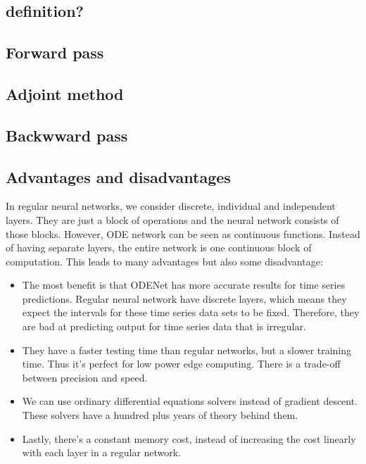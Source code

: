 \documentclass[10pt,a4paper]{article}
\theoremstyle{definition}
\theoremstyle{theorem}
\begin{document}
\subsection{definition?}

\subsection{Forward pass}

\subsection{Adjoint method}
 
\subsection{Backwward pass}

\subsection{Advantages and disadvantages  }

In regular neural networks, we consider discrete, individual and independent layers. They are just a block of operations and the neural network consists of those blocks. However, ODE network can be seen as continuous functions. Instead of having separate layers, the entire network is one continuous block of computation. This leads to many advantages but also some disadvantage:
\begin{itemize}
\item The most benefit is that ODENet has more accurate results for time series predictions. Regular neural network have discrete layers, which means they expect the intervals for these time series data sets to be fixed. Therefore, they are bad at predicting output for time series data that is irregular.
\item They have a faster testing time than regular networks, but a slower training time. Thus it's perfect for low power edge computing. There is a trade-off between precision and speed.
\item We can use ordinary differential equations solvers instead of gradient descent. These solvers have a hundred plus years of theory behind them.
\item Lastly, there's a constant memory cost, instead of increasing the cost linearly with each layer in a regular network.
\end{itemize}
\end{document}
